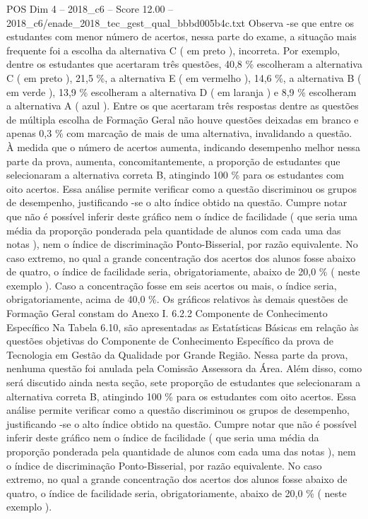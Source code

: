 \begin{textsample}{POS Dim 4 – 2018\_c6 – Score 12.00 – 2018\_c6/enade\_2018\_tec\_gest\_qual\_bbbd005b4c.txt}
Observa -se que entre os estudantes com menor número de acertos, nessa parte do exame, a situação mais frequente foi a escolha da alternativa C ( em preto ), incorreta.
Por exemplo, dentre os estudantes que acertaram três questões, 40,8 \% escolheram a alternativa C ( em preto ), 21,5 \%, a alternativa E ( em vermelho ), 14,6 \%, a alternativa B ( em verde ), 13,9 \% escolheram a alternativa D ( em laranja ) e 8,9 \% escolheram a alternativa A ( azul ).
Entre os que acertaram três respostas dentre as questões de múltipla escolha de Formação Geral não houve questões deixadas em branco e apenas 0,3 \% com marcação de mais de uma alternativa, invalidando a questão.
À medida que o número de acertos aumenta, indicando desempenho melhor nessa parte da prova, aumenta, concomitantemente, a proporção de estudantes que selecionaram a alternativa correta B, atingindo 100 \% para os estudantes com oito acertos.
Essa análise permite verificar como a questão discriminou os grupos de desempenho, justificando -se o alto índice obtido na questão.
Cumpre notar que não é possível inferir deste gráfico nem o índice de facilidade ( que seria uma média da proporção ponderada pela quantidade de alunos com cada uma das notas ), nem o índice de discriminação Ponto-Bisserial, por razão equivalente.
No caso extremo, no qual a grande concentração dos acertos dos alunos fosse abaixo de quatro, o índice de facilidade seria, obrigatoriamente, abaixo de 20,0 \% ( neste exemplo ).
Caso a concentração fosse em seis acertos ou mais, o índice seria, obrigatoriamente, acima de 40,0 \%.
Os gráficos relativos às demais questões de Formação Geral constam do Anexo I. 6.2.2 Componente de Conhecimento Específico Na Tabela 6.10, são apresentadas as Estatísticas Básicas em relação às questões objetivas do Componente de Conhecimento Específico da prova de Tecnologia em Gestão da Qualidade por Grande Região.
Nessa parte da prova, nenhuma questão foi anulada pela Comissão Assessora da Área.
Além disso, como será discutido ainda nesta seção, sete proporção de estudantes que selecionaram a alternativa correta B, atingindo 100 \% para os estudantes com oito acertos.
Essa análise permite verificar como a questão discriminou os grupos de desempenho, justificando -se o alto índice obtido na questão.
Cumpre notar que não é possível inferir deste gráfico nem o índice de facilidade ( que seria uma média da proporção ponderada pela quantidade de alunos com cada uma das notas ), nem o índice de discriminação Ponto-Bisserial, por razão equivalente.
No caso extremo, no qual a grande concentração dos acertos dos alunos fosse abaixo de quatro, o índice de facilidade seria, obrigatoriamente, abaixo de 20,0 \% ( neste exemplo ).

\end{textsample}
